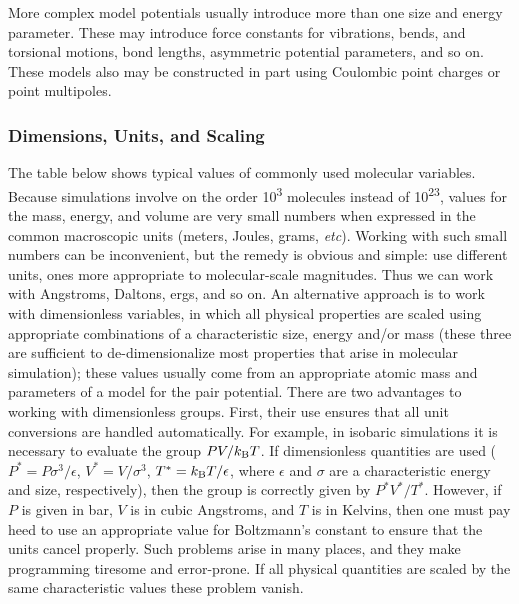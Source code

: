 \documentclass[]{article}
\begin{document}
More complex model potentials usually introduce more than one size and
energy parameter. These may introduce force constants for vibrations,
bends, and torsional motions, bond lengths, asymmetric potential
parameters, and so on. These models also may be constructed in part
using Coulombic point charges or point multipoles.

\subsubsection{Dimensions, Units, and
Scaling}\label{dimensions-units-and-scaling}

The table below shows typical values of commonly used
molecular variables. Because simulations involve on the order
10\textsuperscript{3} molecules instead of 10\textsuperscript{23},
values for the mass, energy, and volume are very small numbers when
expressed in the common macroscopic units (meters, Joules, grams,
\emph{etc}). Working with such small numbers can be inconvenient, but
the remedy is obvious and simple: use different units, ones more
appropriate to molecular-scale magnitudes. Thus we can work with
Angstroms, Daltons, ergs, and so on. An alternative approach is to work
with dimensionless variables, in which all physical properties are
scaled using appropriate combinations of a characteristic size, energy
and/or mass (these three are sufficient to de-dimensionalize most
properties that arise in molecular simulation); these values usually
come from an appropriate atomic mass and parameters of a model for the
pair potential. There are two advantages to working with dimensionless
groups. First, their use ensures that all unit conversions are handled
automatically. For example, in isobaric simulations it is necessary to
evaluate the group $PV/k_{\rm B}T$. If dimensionless quantities are used ($P^* =
P\sigma^3/\epsilon$, $V^* = V/\sigma^3$, $T^* = k_{\rm B}T/\epsilon$, where $\epsilon$
and $\sigma$ are a characteristic energy and size, respectively), then the
group is correctly given by $P^*V^*/T^*$. However, if $P$ is given in
bar, $V$ is in cubic Angstroms, and $T$ is in Kelvins, then one must
pay heed to use an appropriate value for Boltzmann's constant to ensure
that the units cancel properly. Such problems arise in many places, and
they make programming tiresome and error-prone. If all physical
quantities are scaled by the same characteristic values these problem
vanish.
\end{document}
